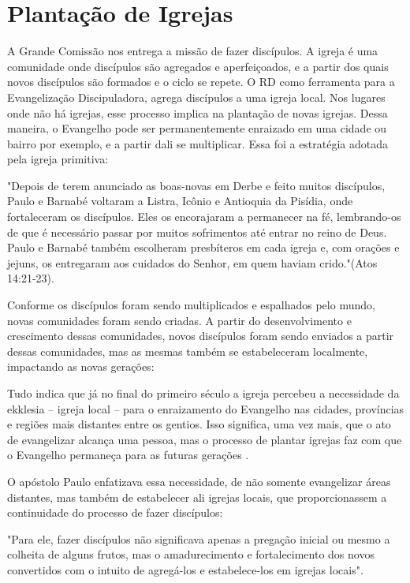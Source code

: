 \documentclass[12pt]{abntex2}
\begin{document}
\section{Plantação de Igrejas}

A Grande Comissão nos entrega a missão de fazer discípulos. A igreja é uma comunidade onde discípulos são agregados e aperfeiçoados, e a partir dos quais novos discípulos são formados e o ciclo se repete. O RD como ferramenta para a Evangelização Discipuladora, agrega discípulos a uma igreja local. Nos lugares onde não há igrejas, esse processo implica na plantação de novas igrejas. Dessa maneira, o Evangelho pode ser permanentemente enraizado em uma cidade ou bairro por exemplo, e a partir dali se multiplicar\cite[p. 99,100]{brandao}. Essa foi a estratégia adotada pela igreja primitiva: 

\begin{citacao}"Depois de terem anunciado as boas-novas em Derbe e feito muitos discípulos, Paulo e Barnabé voltaram a Listra, Icônio e Antioquia da Pisídia, onde fortaleceram os discípulos. Eles os encorajaram a permanecer na fé, lembrando-os de que é necessário passar por muitos sofrimentos até entrar no reino de Deus. Paulo e Barnabé também escolheram presbíteros em cada igreja e, com orações e jejuns, os entregaram aos cuidados do Senhor, em quem haviam crido."(Atos 14:21-23).\end{citacao}

Conforme os discípulos foram sendo multiplicados e espalhados pelo mundo, novas comunidades foram sendo criadas. A partir do desenvolvimento e crescimento dessas comunidades, novos discípulos foram sendo enviados a partir dessas comunidades, mas as mesmas também se estabeleceram localmente, impactando as novas gerações:

\begin{citacao}Tudo indica que já no final do primeiro século a igreja percebeu a necessidade da ekklesia – igreja local – para o enraizamento do Evangelho nas cidades, províncias e regiões mais distantes entre os gentios. Isso significa, uma vez mais, que o ato de evangelizar alcança uma pessoa, mas o processo de plantar igrejas	faz com que o Evangelho permaneça para as futuras gerações \cite[p. 101]{brandao}.\end{citacao}

O apóstolo Paulo enfatizava essa necessidade, de não somente evangelizar áreas distantes, mas também de estabelecer ali igrejas locais, que proporcionassem a continuidade do processo de fazer discípulos: \begin{citacao}"Para ele, fazer discípulos não significava apenas a pregação inicial ou mesmo a colheita de alguns frutos, mas o amadurecimento e fortalecimento dos novos convertidos com o intuito de agregá-los e estabelece-los em igrejas locais"\cite[p. 101]{brandao}.\end{citacao}
\end{document}
